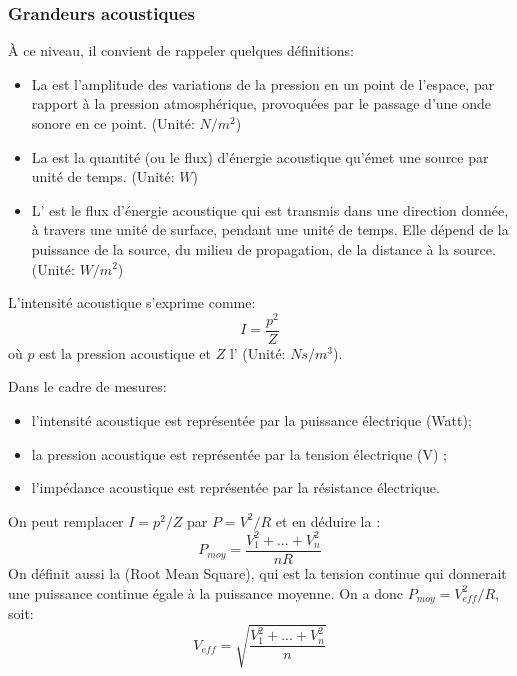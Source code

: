 \medskip
\subsubsection{Grandeurs acoustiques}

À ce niveau, il convient de rappeler quelques définitions:
\begin{itemize}
   \item La  est l'amplitude des variations de la pression en un point de l'espace, par rapport à la pression atmosphérique, provoquées par le passage d'une onde sonore en ce point. (Unité: $N/m^2$)
   \item La  est la quantité (ou le flux) d'énergie acoustique qu'émet une source par unité de temps. (Unité: $W$)
   \item L' est le flux d'énergie acoustique qui est transmis dans une direction donnée, à travers une unité de surface, pendant une unité de temps. Elle dépend de la puissance de la source, du milieu de propagation, de la distance à la source. (Unité: $W/m^2$)
\end{itemize}

\medskip
L'intensité acoustique s'exprime comme:
\begin{equation}
I = \frac{p^2}{Z}
\end{equation}
où $p$ est la pression acoustique et $Z$ l' (Unité: $Ns/m^3$).

\medskip
Dans le cadre de mesures:
\begin{itemize}
   \item l'intensité acoustique est représentée par la puissance électrique (Watt);
   \item la pression acoustique est représentée par la tension électrique (V) ;
   \item l'impédance acoustique est représentée par la résistance électrique.
\end{itemize}
On peut remplacer $I = p^2/Z$ par $P = V^2/R$ et en déduire la :
\begin{equation}
P_{moy}=\dfrac{V_1^2+...+V_n^2}{nR}
\end{equation}
On définit aussi la  (Root Mean Square), qui est la tension continue qui donnerait une puissance continue égale à la puissance moyenne. On a donc $P_{moy}=V_{eff}^2/R$, soit:
\begin{equation}
V_{eff}=\sqrt{\dfrac{V_1^2+...+V_n^2}{n}}
\end{equation}

